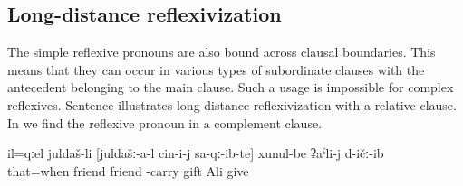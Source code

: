
\subsection{Long-distance reflexivization}
\label{ssec:Long-distance reflexivization}

The simple reflexive pronouns are also bound across clausal boundaries. This means that they can occur in various types of subordinate clauses with the antecedent belonging to the main clause. Such a usage is impossible for complex reflexives. Sentence  illustrates long-distance reflexivization with a relative clause. In  we find the reflexive pronoun in a complement clause.
%
\begin{exe}
	\ex	\label{ex:At that the friend gave to Ali the gifts@5}
	\gll	il=qːel	juldaš-li	[juldašː-a-l	cin-i-j	sa-qː-ib-te]		xunul-be	ʡaˁli-j	d-ičː-ib\\
		that=when	friend	friend		-carry 		gift	Ali	give\\
	\glt	{}	
\end{exe}


